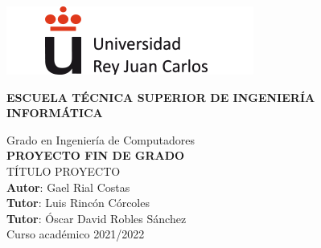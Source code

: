 \thispagestyle{empty}

\includegraphics{images/LOGOURJC2}
\vspace{2cm}

\begin{center}
	\large{\textbf{ESCUELA TÉCNICA SUPERIOR DE INGENIERÍA INFORMÁTICA}}
	\vspace{5mm}

 	{\Large {Grado en Ingeniería de Computadores}}
    \\
  	\vspace{34mm}
	{\large {\bf PROYECTO FIN DE GRADO}}
  	\vspace{10mm}
    \\
  	{\Large {{\Huge {
  		TÍTULO PROYECTO
	}} \\[1cm] }}
  	\vspace{2cm}
	{\large {
        \textbf{Autor}: Gael Rial Costas\\
        \textbf{Tutor}: Luis Rincón Córcoles\\
        \textbf{Tutor}: Óscar David Robles Sánchez\\
  	}}
	\vspace{10mm}
  	{\large {Curso académico 2021/2022}}
  	\vspace{1cm}
\end{center}